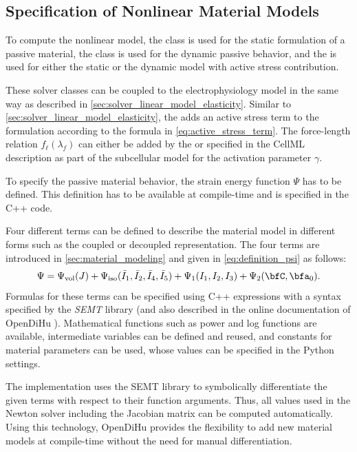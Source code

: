 \subsection{Specification of Nonlinear Material Models}\label{sec:specification_of_nonlinear_ma}

To compute the nonlinear model, the  class is used for the static formulation of a passive material, the  class is used for the dynamic passive behavior, and the  is used for either the static or the dynamic model with active stress contribution.

These solver classes can be coupled to the electrophysiology model in the same way as described in \cref{sec:solver_linear_model_elasticity}.
Similar to \cref{sec:solver_linear_model_elasticity}, the  adds an active stress term to the formulation according to the formula in \cref{eq:active_stress_term}. The force-length relation $f_\ell(\lambda_f)$ can either be added by the   or specified in the CellML description as part of the subcellular model for the activation parameter $\gamma$.

To specify the passive material behavior, the strain energy function $\Psi$ has to be defined.
This definition has to be available at compile-time and is specified in the C++ code. 

Four different terms can be defined to describe the material model in different forms such as the coupled or decoupled representation. The four terms are introduced in \cref{sec:material_modeling} and given in \cref{eq:definition_psi} as follows:
\begin{align}\label{eq:definition_psi1}
  \Psi = \Psi_\text{vol}(J) + \Psi_\text{iso}(\bar{I}_1,\bar{I}_2,\bar{I}_4,\bar{I}_5) + \Psi_1(I_1,I_2,I_3) + \Psi_2(\bfC,\bfa_0).
\end{align}
Formulas for these terms can be specified using C++ expressions with a syntax specified by the \emph{SEMT} library \cite{semt,gutterman2004symbolic} (and also described in the online documentation of OpenDiHu \cite{opendihuWeb}). Mathematical functions such as power and log functions are available, intermediate variables can be defined and reused, and constants for material parameters can be used, whose values can be specified in the Python settings.

The implementation uses the SEMT library to symbolically differentiate the given terms with respect to their function arguments. Thus, all values used in the Newton solver including the Jacobian matrix can be computed automatically. Using this technology, OpenDiHu provides the flexibility to add new material models at compile-time without the need for manual differentiation.

